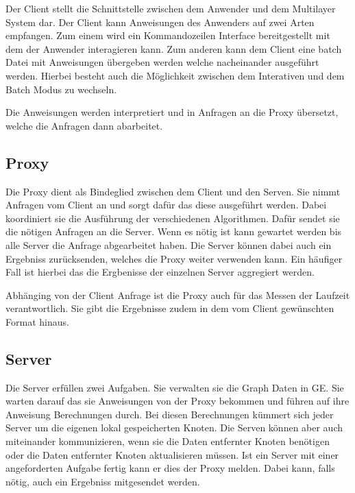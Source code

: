 Der Client stellt die Schnittstelle zwischen dem Anwender und dem Multilayer System dar. Der Client kann Anweisungen des Anwenders auf zwei Arten empfangen.
Zum einem wird ein Kommandozeilen Interface bereitgestellt mit dem der Anwender interagieren kann. Zum anderen kann dem Client eine batch Datei mit Anweisungen übergeben werden
welche nacheinander ausgeführt werden.
Hierbei besteht auch die Möglichkeit zwischen dem Interativen und dem Batch Modus zu wechseln.

Die Anweisungen werden interpretiert und in Anfragen an die Proxy übersetzt, welche die Anfragen dann abarbeitet.

\subsection{Proxy}

Die Proxy dient als Bindeglied zwischen dem Client und den Serven. Sie nimmt Anfragen vom Client an und sorgt dafür das diese ausgeführt werden.
Dabei koordiniert sie die Ausführung der verschiedenen Algorithmen. Dafür sendet sie die nötigen Anfragen an die Server. Wenn es nötig ist kann gewartet werden 
bis alle Server die Anfrage abgearbeitet haben. Die Server können dabei auch ein Ergebniss zurücksenden, welches die Proxy weiter verwenden kann. Ein häufiger Fall
ist hierbei das die Ergbenisse der einzelnen Server aggregiert werden.

Abhänging von der Client Anfrage ist die Proxy auch für das Messen der Laufzeit verantwortlich. Sie gibt die Ergebnisse zudem in dem vom Client
gewünschten Format hinaus.


\subsection{Server}

Die Server erfüllen zwei Aufgaben. Sie verwalten sie die Graph Daten in GE.
Sie warten darauf das sie Anweisungen von der Proxy bekommen und führen auf ihre Anweisung Berechnungen durch. Bei diesen Berechnungen kümmert sich jeder Server 
um die eigenen lokal gespeicherten Knoten. Die Serven können aber auch miteinander kommunizieren, wenn sie die Daten entfernter Knoten benötigen oder die Daten entfernter Knoten
aktualisieren müssen.
Ist ein Server mit einer angeforderten Aufgabe fertig kann er dies der Proxy melden. Dabei kann, falls nötig, auch ein Ergebniss mitgesendet werden.



